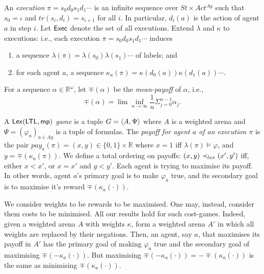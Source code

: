 		

An \emph{execution} $\pi = s_0 d_0 s_1 d_1 \cdots$ is an infinite sequence over $St \times Act^{Ag}$ such that $s_0 = \iota$ and 
$tr(s_i,d_i) = s_{i+1}$ for all $i$.
In particular, $d_i(a)$ is the action of agent $a$ in step $i$. Let ${\sf Exec}$ denote the set of all
executions. Extend $\lambda$ and $\kappa$ to executions: i.e., each execution $\pi = s_0 d_0 s_1 d_1 \cdots $ induces
\begin{enumerate}

\item a sequence $\lambda(\pi) = \lambda(s_0) \lambda(s_1) \cdots$  of labels; and

\item for each agent $a$, a sequence $\kappa_a(\pi) = \kappa(d_0(a)) \kappa(d_1(a)) \cdots$.
\end{enumerate}



For a sequence $\alpha \in \mathbb{R}^\omega$, let $\mp(\alpha)$ be the \emph{mean-payoff} of $\alpha$, i.e., 
\[
 \mp(\alpha) = \lim \inf_{n \to \infty} \frac{1}{n} \Sigma_{j=0}^{n-1} \alpha_j.
\]



A \emph{${\sf Lex}(\mathsf{LTL},{\sf mp})$ game} is a tuple $G = \langle {A,\Psi} \rangle$ where $A$ is a weighted arena and $\Psi = (\varphi_a)_{a \in Ag}$ is a tuple of \LTL formulas.
The \emph{payoff for agent $a$ of an execution $\pi$} is the pair $pay_a(\pi) = (x,y) \in \{0,1\} \times \mathbb{R}$ where
$x = 1$ iff $\lambda(\pi) \models \varphi$, and $y = \mp(\kappa_a(\pi))$. We define a total ordering on payoffs:
$(x,y) \prec_{lex} (x',y')$ iff, either $x < x'$, or $x = x'$ and $y < y'$. Each agent is trying to maximise its payoff. In other words, agent $a$'s primary goal is to make $\varphi_a$ true, and its secondary goal is to maximise it's reward $\mp(\kappa_a(\cdot))$. 

\begin{remark}
We consider weights to be rewards to be maximised. One may, instead, consider them costs to be minimised. All our results hold for such cost-games. Indeed, given a weighted arena $A$ with weights $\kappa$, form a weighted arena $A'$ in which all weights are replaced by their negations. 
Then, an agent, say $a$, that maximises its payoff in $A'$ has the primary goal of making $\varphi_a$ true and the secondary goal of maximising $\mp(-\kappa_a(\cdot))$. 
But maximising $\mp(-\kappa_a(\cdot)) = - \mp(\kappa_a(\cdot))$ is the same as minimising $\mp(\kappa_a(\cdot))$.
\end{remark}
 
